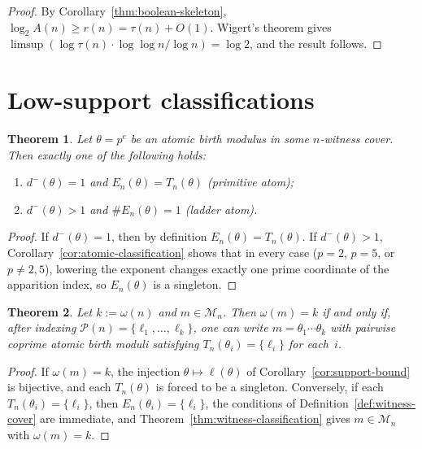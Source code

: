 \documentclass[11pt,letterpaper]{article}
\numberwithin{equation}{section}
\theoremstyle{plain}
\newtheorem{theorem}{Theorem}[section]
\theoremstyle{definition}
\theoremstyle{remark}
\begin{document}
\begin{proof}
By Corollary~\ref{thm:boolean-skeleton}, $\log_2 A(n)\ge r(n)=\tau(n)+O(1)$.
Wigert's theorem \cite{Wigert1907Divisors} gives
$\limsup(\log\tau(n)\cdot\log\log n/\log n)=\log 2$,
and the result follows.
\end{proof}

\section{Low-support classifications}\label{sec:low-support}

\begin{theorem}\label{thm:primitive-ladder-dichotomy}
Let $\theta=p^e$ be an atomic birth modulus in some $n$-witness cover. Then
exactly one of the following holds:
\begin{enumerate}[label=\textup{(\alph*)}]
\item $d^-(\theta)=1$ and $E_n(\theta)=T_n(\theta)$
\textup{(primitive atom)};
\item $d^-(\theta)>1$ and $\#E_n(\theta)=1$
\textup{(ladder atom)}.
\end{enumerate}
\end{theorem}

\begin{proof}
If $d^-(\theta)=1$, then by definition
$E_n(\theta)=T_n(\theta)$.
If $d^-(\theta)>1$, Corollary~\ref{cor:atomic-classification} shows that in
every case ($p=2$, $p=5$, or $p\neq 2,5$), lowering the exponent changes
exactly one prime coordinate of the apparition index, so $E_n(\theta)$ is a
singleton.
\end{proof}

\begin{theorem}\label{thm:extremal-coordinate-separation}
Let $k:=\omega(n)$ and $m\in\mathcal M_n$. Then $\omega(m)=k$ if and only
if, after indexing $\mathcal P(n)=\{\ell_1,\dots,\ell_k\}$, one can write
$m=\theta_1\cdots\theta_k$ with pairwise coprime atomic birth moduli
satisfying $T_n(\theta_i)=\{\ell_i\}$ for each~$i$.
\end{theorem}

\begin{proof}
If $\omega(m)=k$, the injection $\theta\mapsto\ell(\theta)$ of
Corollary~\ref{cor:support-bound} is bijective, and each $T_n(\theta)$ is
forced to be a singleton. Conversely, if each $T_n(\theta_i)=\{\ell_i\}$,
then $E_n(\theta_i)=\{\ell_i\}$, the conditions of
Definition~\ref{def:witness-cover} are immediate, and
Theorem~\ref{thm:witness-classification} gives $m\in\mathcal M_n$ with
$\omega(m)=k$.
\end{proof}
\end{document}

